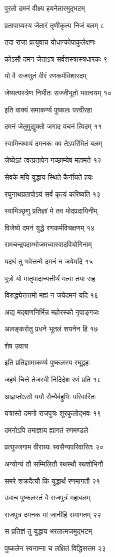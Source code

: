 पुरतो दमनं वीक्ष्य हयनेतारमुद्भटम्

प्रतापाग्र्यस्य जेतारं तृणीकृत्य निजं बलम् ८

तदा राजा प्रत्युवाच योधान्कोपाकुलेक्षणः

कोऽसौ दमन जेताऽत्र सर्वशस्त्रास्त्रधारकः ९

यो वै राजसुतं वीरं रणकर्मविशारदम्

जेष्यत्यस्त्रेण निर्भीतः सज्जीभूतो भवत्वयम् १०

इति वाक्यं समाकर्ण्य पुष्कलः परवीरहा

दमनं जेतुमुद्युक्तो जगाद वचनं त्विदम् ११

स्वामिन्क्वायं दमनकः क्व तेऽपरिमितं बलम्

जेष्येऽहं त्वत्प्रतापेन गच्छाम्येष महामते १२

सेवके मयि युद्धाय स्थिते कैर्नीयते हयः

रघुनाथप्रतापोऽयं सर्वं कृत्यं करिष्यति १३

स्वामिञ्छृणु प्रतिज्ञां मे तव मोदप्रदायिनीम्

विजेष्ये दमनं युद्धे रणकर्मविचक्षणम् १४

रामचन्द्रपदाम्भोजमध्वास्वादवियोगिनाम्

यदघं तु भवेत्तन्मे दमनं न जयेयदि १५

पुत्रो यो मातृपादान्यत्तीर्थं मत्वा तया सह

विरुद्ध्येत्तत्तमो मह्यं न जयेदमनं यदि १६

अद्य मद्बाणनिर्भिन्न महोरस्को नृपाङ्गजः

अलङ्करोतु प्रधने भूतलं शयनेन हि १७

शेष उवाच

इति प्रतिज्ञामाकर्ण्य पुष्कलस्य रघूद्वहः

जहर्ष चित्ते तेजस्वी निदिदेश रणं प्रति १८

आज्ञप्तोऽसौ ययौ सैन्यैर्बहुभिः परिवारितः

यत्रास्ते दमनो राजपुत्रः शूरकुलोद्भवः १९

दमनोऽपि तमाज्ञाय ह्यागतं रणमण्डले

प्रत्युज्जगाम वीराग्र्यः स्वसैन्यपरिवारितः २०

अन्योन्यं तौ सम्मिलितौ रथस्थौ रथशोभिनौ

समरे शक्रदैत्यौ किं युद्धार्थं रणमागतौ २१

उवाच पुष्कलस्तं वै राजपुत्रं महाबलम्

राजपुत्र दमनक मां जानीहि समागतम् २२

स प्रतिज्ञं तु युद्धाय भरतात्मजमुद्भटम्

पुष्कलेन स्वनाम्ना च लक्षितं विद्धिसत्तम २३


